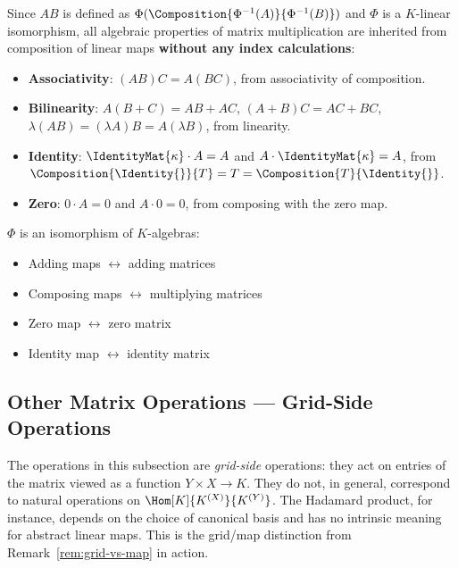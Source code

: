 \begin{remark}
    Since $AB$ is defined as $\Phi(\Composition{\Phi^{-1}(A)}{\Phi^{-1}(B)})$ and $\Phi$
    is a $K$-linear isomorphism, all algebraic properties of matrix multiplication are
    inherited from composition of linear maps \textbf{without any index calculations}:
    \begin{itemize}
        \item \textbf{Associativity}: $(AB)C = A(BC)$, from associativity of composition.
        \item \textbf{Bilinearity}: $A(B + C) = AB + AC$,\;
              $(A + B)C = AC + BC$,\;
              $\lambda(AB) = (\lambda A)B = A(\lambda B)$, from linearity.
        \item \textbf{Identity}: $\IdentityMat{\kappa} \cdot A = A$ and $A \cdot \IdentityMat{\kappa} = A$,
              from $\Composition{\Identity{}}{T} = T = \Composition{T}{\Identity{}}$.
        \item \textbf{Zero}: $0 \cdot A = 0$ and $A \cdot 0 = 0$, from composing with the
              zero map.
    \end{itemize}
\end{remark}

\begin{corollary}
\label{cor:end-algebra-iso}
    $\Phi$ is an isomorphism of $K$-algebras:
    \begin{itemize}
        \item Adding maps $\leftrightarrow$ adding matrices
        \item Composing maps $\leftrightarrow$ multiplying matrices
        \item Zero map $\leftrightarrow$ zero matrix
        \item Identity map $\leftrightarrow$ identity matrix
    \end{itemize}
\end{corollary}

\subsection{Other Matrix Operations --- Grid-Side Operations}

\begin{remark}
    The operations in this subsection are \emph{grid-side} operations: they act on entries of the
    matrix viewed as a function $Y \times X \to K$. They do not, in general, correspond to natural
    operations on $\Hom[K]{K^{(X)}}{K^{(Y)}}$. The Hadamard product, for instance, depends on the
    choice of canonical basis and has no intrinsic meaning for abstract linear maps. This is the
    grid/map distinction from Remark~\ref{rem:grid-vs-map} in action.
\end{remark}


